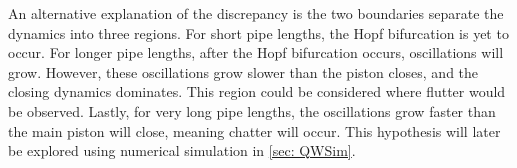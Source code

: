 \newpage
An alternative explanation of the discrepancy is the two boundaries separate the dynamics into three
regions.
For short pipe lengths, the Hopf bifurcation is yet to occur.
For longer pipe lengths, after the Hopf bifurcation occurs, oscillations will grow. However, these oscillations grow slower than the piston closes, and the closing dynamics dominates. This region could be considered where flutter would be observed. Lastly, for very long pipe lengths, the oscillations grow faster than the main piston will close, meaning chatter will occur. This hypothesis will later be explored using numerical simulation in \cref{sec: QWSim}.

